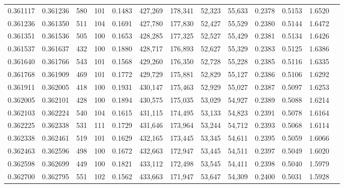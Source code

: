 \begin{tabular}{rrrrrrrrrrrrr}
0.361117 & 0.361236 &   580 & 101 &                                     0.1483 & 427,269 & 178,341 &  52,323 &  55,633 & 0.2378 & 0.5153 & 1.6520 \\
0.361236 & 0.361350 &   511 & 104 &                                     0.1691 & 427,780 & 177,830 &  52,427 &  55,529 & 0.2380 & 0.5144 & 1.6472 \\
0.361351 & 0.361536 &   505 & 100 &                                     0.1653 & 428,285 & 177,325 &  52,527 &  55,429 & 0.2381 & 0.5134 & 1.6426 \\
0.361537 & 0.361637 &   432 & 100 &                                     0.1880 & 428,717 & 176,893 &  52,627 &  55,329 & 0.2383 & 0.5125 & 1.6386 \\
0.361640 & 0.361766 &   543 & 101 &                                     0.1568 & 429,260 & 176,350 &  52,728 &  55,228 & 0.2385 & 0.5116 & 1.6335 \\
0.361768 & 0.361909 &   469 & 101 &                                     0.1772 & 429,729 & 175,881 &  52,829 &  55,127 & 0.2386 & 0.5106 & 1.6292 \\
0.361911 & 0.362005 &   418 & 100 &                                     0.1931 & 430,147 & 175,463 &  52,929 &  55,027 & 0.2387 & 0.5097 & 1.6253 \\
0.362005 & 0.362101 &   428 & 100 &                                     0.1894 & 430,575 & 175,035 &  53,029 &  54,927 & 0.2389 & 0.5088 & 1.6214 \\
0.362103 & 0.362224 &   540 & 104 &                                     0.1615 & 431,115 & 174,495 &  53,133 &  54,823 & 0.2391 & 0.5078 & 1.6164 \\
0.362225 & 0.362338 &   531 & 111 &                                     0.1729 & 431,646 & 173,964 &  53,244 &  54,712 & 0.2393 & 0.5068 & 1.6114 \\
0.362338 & 0.362461 &   519 & 101 &                                     0.1629 & 432,165 & 173,445 &  53,345 &  54,611 & 0.2395 & 0.5059 & 1.6066 \\
0.362463 & 0.362596 &   498 & 100 &                                     0.1672 & 432,663 & 172,947 &  53,445 &  54,511 & 0.2397 & 0.5049 & 1.6020 \\
0.362598 & 0.362699 &   449 & 100 &                                     0.1821 & 433,112 & 172,498 &  53,545 &  54,411 & 0.2398 & 0.5040 & 1.5979 \\
0.362700 & 0.362795 &   551 & 102 &                                     0.1562 & 433,663 & 171,947 &  53,647 &  54,309 & 0.2400 & 0.5031 & 1.5928 \\

\end{tabular}

